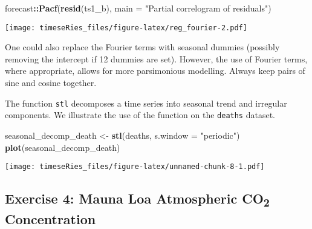 \documentclass[]{book}
\newenvironment{Shaded}{\begin{snugshade}}{\end{snugshade}}
\newcommand{\KeywordTok}[1]{\textcolor[rgb]{0.13,0.29,0.53}{\textbf{#1}}}
\newcommand{\DataTypeTok}[1]{\textcolor[rgb]{0.13,0.29,0.53}{#1}}
\newcommand{\StringTok}[1]{\textcolor[rgb]{0.31,0.60,0.02}{#1}}
\newcommand{\OperatorTok}[1]{\textcolor[rgb]{0.81,0.36,0.00}{\textbf{#1}}}
\newcommand{\NormalTok}[1]{#1}
\begin{document}
\begin{Shaded}
\begin{Highlighting}[]
\NormalTok{forecast}\OperatorTok{::}\KeywordTok{Pacf}\NormalTok{(}\KeywordTok{resid}\NormalTok{(ts1_b), }\DataTypeTok{main =} \StringTok{"Partial correlogram of residuals"}\NormalTok{)}
\end{Highlighting}
\end{Shaded}

\texttt{[image: timeseRies\_files/figure-latex/reg\_fourier-2.pdf]}

One could also replace the Fourier terms with seasonal dummies (possibly
removing the intercept if 12 dummies are set). However, the use of
Fourier terms, where appropriate, allows for more parsimonious
modelling. Always keep pairs of sine and cosine together.

The function \texttt{stl} decomposes a time series into seasonal trend
and irregular components. We illustrate the use of the function on the
\texttt{deaths} dataset.

\begin{Shaded}
\begin{Highlighting}[]
\NormalTok{seasonal_decomp_death <-}\StringTok{ }\KeywordTok{stl}\NormalTok{(deaths, }\DataTypeTok{s.window =} \StringTok{"periodic"}\NormalTok{)}
\KeywordTok{plot}\NormalTok{(seasonal_decomp_death)}
\end{Highlighting}
\end{Shaded}

\texttt{[image: timeseRies\_files/figure-latex/unnamed-chunk-8-1.pdf]}

\subsection{\texorpdfstring{Exercise 4: Mauna Loa Atmospheric
CO\textsubscript{2}
Concentration}{Exercise 4: Mauna Loa Atmospheric CO2 Concentration}}\label{exercise-4-mauna-loa-atmospheric-co2-concentration}
\end{document}
